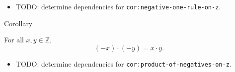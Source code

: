 \begin{dependencies}
\begin{itemize}
  \item TODO: determine dependencies for \texttt{cor:negative-one-rule-on-z}.
\end{itemize}
\end{dependencies}

\begin{corollarybox}{Corollary}
\begin{corollary}
\label{cor:product-of-negatives-on-z}
For all $x,y\in\mathbb{Z}$,
\[
(-x)\cdot(-y)=x\cdot y.
\]
\end{corollary}
\end{corollarybox}

\begin{dependencies}
\begin{itemize}
  \item TODO: determine dependencies for \texttt{cor:product-of-negatives-on-z}.
\end{itemize}
\end{dependencies}
